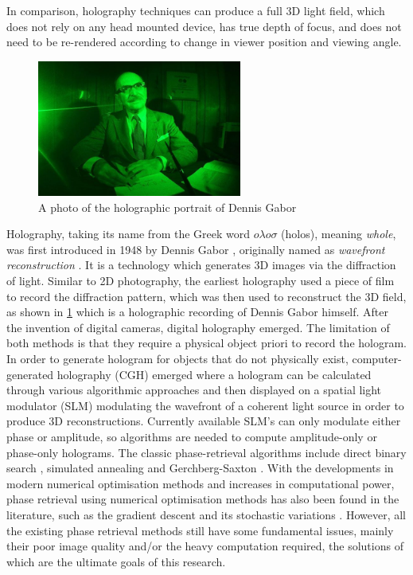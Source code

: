 In comparison, holography techniques can produce a full 3D light field, which does not rely on any head mounted device, has true depth of focus, and does not need to be re-rendered according to change in viewer position and viewing angle.

\begin{figure}[H]
    \centering
    \includegraphics[width=0.6\textwidth]{Dennis-Gabor-Hologram-2.jpg}
    \caption{A photo of the holographic portrait of Dennis Gabor \cite{Lo2018}}\label{fig:Dennis-Gabor-Hologram-2}
\end{figure}

Holography, taking its name from the Greek word $o \lambda o \sigma $ (holos), meaning \textit{whole}, was first introduced in 1948 by Dennis Gabor \cite{Gabor1948}, originally named as \textit{wavefront reconstruction} \cite{Hecht2017}. It is a technology which generates 3D images via the diffraction of light. Similar to 2D photography, the earliest holography used a piece of film to record the diffraction pattern, which was then used to reconstruct the 3D field, as shown in \cref{fig:Dennis-Gabor-Hologram-2} which is a holographic recording of Dennis Gabor himself. After the invention of digital cameras, digital holography emerged. The limitation of both methods is that they require a physical object priori to record the hologram. In order to generate hologram for objects that do not physically exist, computer-generated holography (CGH) emerged where a hologram can be calculated through various algorithmic approaches and then displayed on a spatial light modulator (SLM) modulating the wavefront of a coherent light source in order to produce 3D reconstructions. Currently available SLM's can only modulate either phase or amplitude, so algorithms are needed to compute amplitude-only or phase-only holograms. The classic phase-retrieval algorithms include direct binary search \cite{Seldowitz1987}, simulated annealing \cite{Kirkpatrick1983} and Gerchberg-Saxton \cite{Gerchberg1972}. With the developments in modern numerical optimisation methods and increases in computational power, phase retrieval using numerical optimisation methods has also been found in the literature, such as the gradient descent \cite{Zhang2017, Liu2020} and its stochastic variations \cite{Chen2021, Choi2021, Kadis2022}. However, all the existing phase retrieval methods still have some fundamental issues, mainly their poor image quality and/or the heavy computation required, the solutions of which are the ultimate goals of this research.

